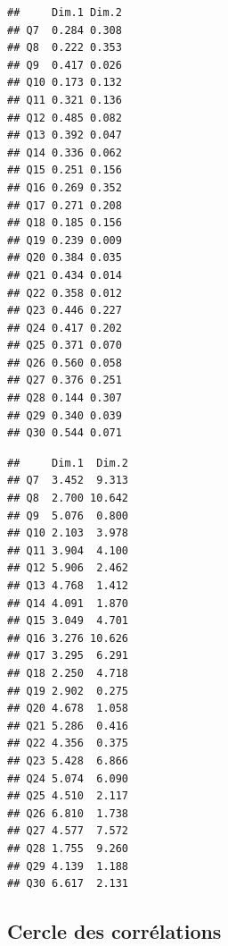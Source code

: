 \documentclass[
]{article}
\newenvironment{Shaded}{\begin{snugshade}}{\end{snugshade}}
\newcommand{\CommentTok}[1]{\textcolor[rgb]{0.56,0.35,0.01}{\textit{#1}}}
\newcommand{\DecValTok}[1]{\textcolor[rgb]{0.00,0.00,0.81}{#1}}
\newcommand{\FunctionTok}[1]{\textcolor[rgb]{0.00,0.00,0.00}{#1}}
\newcommand{\NormalTok}[1]{#1}
\newcommand{\SpecialCharTok}[1]{\textcolor[rgb]{0.00,0.00,0.00}{#1}}
\begin{document}
\begin{Shaded}
\end{Shaded}

\begin{verbatim}
##     Dim.1 Dim.2
## Q7  0.284 0.308
## Q8  0.222 0.353
## Q9  0.417 0.026
## Q10 0.173 0.132
## Q11 0.321 0.136
## Q12 0.485 0.082
## Q13 0.392 0.047
## Q14 0.336 0.062
## Q15 0.251 0.156
## Q16 0.269 0.352
## Q17 0.271 0.208
## Q18 0.185 0.156
## Q19 0.239 0.009
## Q20 0.384 0.035
## Q21 0.434 0.014
## Q22 0.358 0.012
## Q23 0.446 0.227
## Q24 0.417 0.202
## Q25 0.371 0.070
## Q26 0.560 0.058
## Q27 0.376 0.251
## Q28 0.144 0.307
## Q29 0.340 0.039
## Q30 0.544 0.071
\end{verbatim}

\begin{Shaded}
\end{Shaded}

\begin{verbatim}
##     Dim.1  Dim.2
## Q7  3.452  9.313
## Q8  2.700 10.642
## Q9  5.076  0.800
## Q10 2.103  3.978
## Q11 3.904  4.100
## Q12 5.906  2.462
## Q13 4.768  1.412
## Q14 4.091  1.870
## Q15 3.049  4.701
## Q16 3.276 10.626
## Q17 3.295  6.291
## Q18 2.250  4.718
## Q19 2.902  0.275
## Q20 4.678  1.058
## Q21 5.286  0.416
## Q22 4.356  0.375
## Q23 5.428  6.866
## Q24 5.074  6.090
## Q25 4.510  2.117
## Q26 6.810  1.738
## Q27 4.577  7.572
## Q28 1.755  9.260
## Q29 4.139  1.188
## Q30 6.617  2.131
\end{verbatim}

\hypertarget{cercle-des-corruxe9lations}{%
\subsection{Cercle des corrélations}\label{cercle-des-corruxe9lations}}
\end{document}
